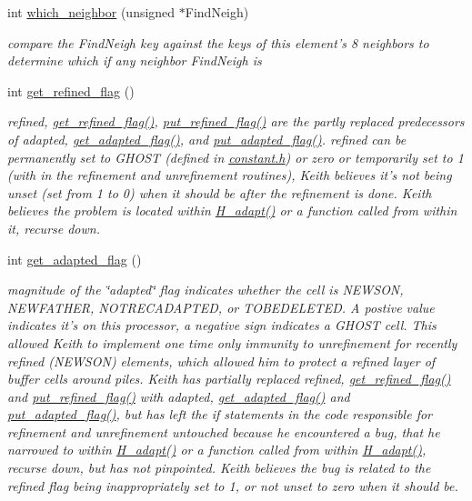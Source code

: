 \begin{CompactItemize}
int \hyperlink{classElement_a32}{which\_\-neighbor} (unsigned $\ast$Find\-Neigh)
\begin{CompactList}\small\item\em compare the Find\-Neigh key against the keys of this element's 8 neighbors to determine which if any neighbor Find\-Neigh is \item\end{CompactList}\item 
int \hyperlink{classElement_a33}{get\_\-refined\_\-flag} ()
\begin{CompactList}\small\item\em refined, \hyperlink{classElement_a33}{get\_\-refined\_\-flag()}, \hyperlink{classElement_a36}{put\_\-refined\_\-flag()} are the partly replaced predecessors of adapted, \hyperlink{classElement_a34}{get\_\-adapted\_\-flag()}, and \hyperlink{classElement_a37}{put\_\-adapted\_\-flag()}. refined can be permanently set to GHOST (defined in \hyperlink{constant_8h}{constant.h}) or zero or temporarily set to 1 (with in the refinement and unrefinement routines), Keith believes it's not being unset (set from 1 to 0) when it should be after the refinement is done. Keith believes the problem is located within \hyperlink{hadpt_8C_a12}{H\_\-adapt()} or a function called from within it, recurse down. \item\end{CompactList}\item 
int \hyperlink{classElement_a34}{get\_\-adapted\_\-flag} ()
\begin{CompactList}\small\item\em magnitude of the \char`\"{}adapted\char`\"{} flag indicates whether the cell is NEWSON, NEWFATHER, NOTRECADAPTED, or TOBEDELETED. A postive value indicates it's on this processor, a negative sign indicates a GHOST cell. This allowed Keith to implement one time only immunity to unrefinement for recently refined (NEWSON) elements, which allowed him to protect a refined layer of buffer cells around piles. Keith has partially replaced refined, \hyperlink{classElement_a33}{get\_\-refined\_\-flag()} and \hyperlink{classElement_a36}{put\_\-refined\_\-flag()} with adapted, \hyperlink{classElement_a34}{get\_\-adapted\_\-flag()} and \hyperlink{classElement_a37}{put\_\-adapted\_\-flag()}, but has left the if statements in the code responsible for refinement and unrefinement untouched because he encountered a bug, that he narrowed to within \hyperlink{hadpt_8C_a12}{H\_\-adapt()} or a function called from within \hyperlink{hadpt_8C_a12}{H\_\-adapt()}, recurse down, but has not pinpointed. Keith believes the bug is related to the refined flag being inappropriately set to 1, or not unset to zero when it should be. \item\end{CompactList}\item 

\end{CompactItemize}
